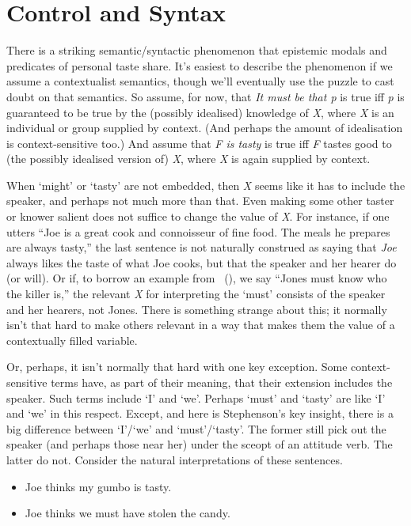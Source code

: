\documentclass[
  10pt,
  letterpaper,
  DIV=11,
  numbers=noendperiod,
  twoside]{scrartcl}
\providecommand{\tightlist}{%
  \setlength{\itemsep}{0pt}\setlength{\parskip}{0pt}}\usepackage{longtable,booktabs,array}
\begin{document}
\section{Control and Syntax}\label{controlandsyntax}

There is a striking semantic/syntactic phenomenon that epistemic modals
and predicates of personal taste share. It's easiest to describe the
phenomenon if we assume a contextualist semantics, though we'll
eventually use the puzzle to cast doubt on that semantics. So assume,
for now, that \emph{It must be that p} is true iff \emph{p} is
guaranteed to be true by the (possibly idealised) knowledge of \emph{X},
where \emph{X} is an individual or group supplied by context. (And
perhaps the amount of idealisation is context-sensitive too.) And assume
that \emph{F is tasty} is true iff \emph{F} tastes good to (the possibly
idealised version of) \emph{X}, where \emph{X} is again supplied by
context.

When `might' or `tasty' are not embedded, then \emph{X} seems like it
has to include the speaker, and perhaps not much more than that. Even
making some other taster or knower salient does not suffice to change
the value of \emph{X}. For instance, if one utters ``Joe is a great cook
and connoisseur of fine food. The meals he prepares are always tasty,''
the last sentence is not naturally construed as saying that \emph{Joe}
always likes the taste of what Joe cooks, but that the speaker and her
hearer do (or will). Or if, to borrow an example from
~(), we say
``Jones must know who the killer is,'' the relevant \emph{X} for
interpreting the `must' consists of the speaker and her hearers, not
Jones. There is something strange about this; it normally isn't that
hard to make others relevant in a way that makes them the value of a
contextually filled variable.

Or, perhaps, it isn't normally that hard with one key exception. Some
context-sensitive terms have, as part of their meaning, that their
extension includes the speaker. Such terms include `I' and `we'. Perhaps
`must' and `tasty' are like `I' and `we' in this respect. Except, and
here is Stephenson's key insight, there is a big difference between
`I'/`we' and `must'/`tasty'. The former still pick out the speaker (and
perhaps those near her) under the sceopt of an attitude verb. The latter
do not. Consider the natural interpretations of these sentences.

\begin{itemize}
\tightlist
\item
  Joe thinks my gumbo is tasty.
\item
  Joe thinks we must have stolen the candy.
\end{itemize}
\end{document}
